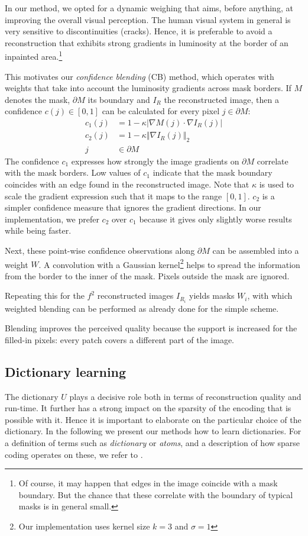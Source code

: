In our method, we opted for a dynamic weighing that aims, before anything, at improving the overall visual perception. 
The human visual system in general is very sensitive to discontinuities (cracks). Hence, it is preferable to avoid a reconstruction that exhibits strong gradients in luminosity at the border of an inpainted area.\footnote{Of course, it may happen that edges in the image coincide with a mask boundary. But the chance that these correlate with the boundary of typical masks is in general small.}

This motivates our \textit{confidence blending} (CB) method, which operates with weights that take into account the luminosity gradients across mask borders. If $M$ denotes the mask, $\partial M$ its boundary and $I_R$ the reconstructed image, then a confidence $c(j) \in [0,1]$ can be calculated for every pixel $j\in \partial M$:
\begin{align*}
c_1(j) &= 1-\kappa|\nabla M(j) \cdot \nabla I_R(j)|\\
c_2(j) &= 1-\kappa \Vert\nabla I_R(j)\Vert_2\\
j &\in \partial M
\end{align*}
The confidence $c_1$ expresses how strongly the image gradients on $\partial M$ correlate with the mask borders. Low values of $c_1$ indicate that the mask boundary coincides with an edge found in the reconstructed image. Note that $\kappa$ is used to scale the gradient expression such that it maps to the range $[0,1]$. $c_2$ is a simpler confidence measure that ignores the gradient directions. In our implementation, we prefer $c_2$ over $c_1$ because it gives only slightly worse results while being faster.

Next, these point-wise confidence observations along $\partial M$ can be assembled into a weight $W$. A convolution with a Gaussian kernel\footnote{Our implementation uses kernel size $k=3$ and $\sigma=1$} helps to spread the information from the border to the inner of the mask. Pixels outside the mask are ignored.

Repeating this for the $f^2$ reconstructed images $I_{R_i}$ yields masks $W_i$, with which weighted blending can be performed as already done for the simple scheme.

Blending improves the perceived quality because the support is increased for the filled-in pixels: every patch covers a different part of the image.



\subsection{Dictionary learning}
The dictionary $U$ plays a decisive role both in terms of reconstruction quality and run-time. It further has a strong impact on the sparsity of the encoding that is possible with it. Hence it is important to elaborate on the particular choice of the dictionary. In the following we present our methods how to learn dictionaries. For a definition of terms such as \textit{dictionary} or \textit{atoms}, and a description of how sparse coding operates on these, we refer to \cite{CIL2015}.

